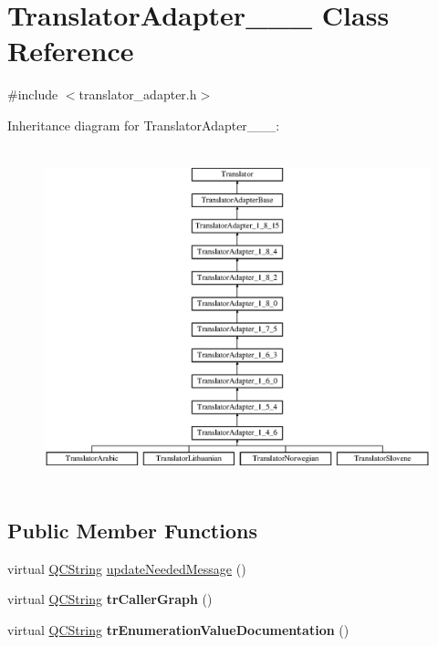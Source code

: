 \hypertarget{class_translator_adapter__1__4__6}{}\section{Translator\+Adapter\+\_\+\_\+\_ Class Reference}
\label{class_translator_adapter__1__4__6}


{\ttfamily \#include $<$translator\+\_\+adapter.\+h$>$}

Inheritance diagram for Translator\+Adapter\+\_\+\_\+\_\+:\begin{figure}[H]
\begin{center}
\leavevmode
\includegraphics[height=9.824561cm]{class_translator_adapter__1__4__6}
\end{center}
\end{figure}
\subsection*{Public Member Functions}
\begin{DoxyCompactItemize}
\item 
virtual \mbox{\hyperlink{class_q_c_string}{Q\+C\+String}} \mbox{\hyperlink{class_translator_adapter__1__4__6_ab19b01d4e00c95ef1e6eb631fbe6ada4}{update\+Needed\+Message}} ()
\item 
\mbox{\label{class_translator_adapter__1__4__6_ab40d3a24ac006a4c4e41cc49c97dddbf}} 
virtual \mbox{\hyperlink{class_q_c_string}{Q\+C\+String}} {\bfseries tr\+Caller\+Graph} ()
\item 
\mbox{\label{class_translator_adapter__1__4__6_a46acaafe098b6f0f1ac86ca80746ff1f}} 
virtual \mbox{\hyperlink{class_q_c_string}{Q\+C\+String}} {\bfseries tr\+Enumeration\+Value\+Documentation} ()
\end{DoxyCompactItemize}
